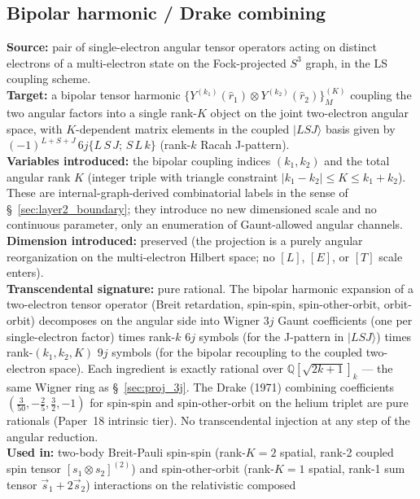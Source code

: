 \documentclass[11pt]{article}
\begin{document}
\subsection{Bipolar harmonic / Drake combining}
\label{sec:proj_bipolar_drake}
\textbf{Source:} pair of single-electron angular tensor operators
acting on distinct electrons of a multi-electron state on the
Fock-projected $S^3$ graph, in the LS coupling scheme.\\
\textbf{Target:} a bipolar tensor harmonic
$\{Y^{(k_1)}(\hat r_1) \otimes Y^{(k_2)}(\hat r_2)\}^{(K)}_M$
coupling the two angular factors into a single rank-$K$ object
on the joint two-electron angular space, with $K$-dependent
matrix elements in the coupled $|LSJ\rangle$ basis given by
$(-1)^{L+S+J}\,6j\{L\,S\,J;\,S\,L\,k\}$ (rank-$k$ Racah J-pattern).\\
\textbf{Variables introduced:} the bipolar coupling indices
$(k_1, k_2)$ and the total angular rank $K$ (integer triple with
triangle constraint $|k_1 - k_2| \le K \le k_1 + k_2$).  These are
internal-graph-derived combinatorial labels in the sense of
\S~\ref{sec:layer2_boundary}; they introduce no new dimensioned
scale and no continuous parameter, only an enumeration of
Gaunt-allowed angular channels.\\
\textbf{Dimension introduced:} preserved (the projection is a
purely angular reorganization on the multi-electron Hilbert
space; no $[L]$, $[E]$, or $[T]$ scale enters).\\
\textbf{Transcendental signature:} pure rational.  The bipolar
harmonic expansion of a two-electron tensor operator (Breit
retardation, spin-spin, spin-other-orbit, orbit-orbit) decomposes
on the angular side into Wigner $3j$ Gaunt coefficients (one per
single-electron factor) times rank-$k$ $6j$ symbols (for the
J-pattern in $|LSJ\rangle$) times rank-$(k_1, k_2, K)$ $9j$
symbols (for the bipolar recoupling to the coupled
two-electron space).  Each ingredient is exactly rational over
$\mathbb{Q}[\sqrt{2k+1}]_{k}$ --- the same Wigner ring as
\S~\ref{sec:proj_3j}.  The Drake (1971) combining coefficients
$(\tfrac{3}{50}, -\tfrac{2}{5}, \tfrac{3}{2}, -1)$ for spin-spin
and spin-other-orbit on the helium triplet are pure rationals
(Paper~18 intrinsic tier).  No transcendental injection at any
step of the angular reduction.\\
\textbf{Used in:} two-body Breit-Pauli spin-spin (rank-$K{=}2$
spatial, rank-2 coupled spin tensor $[s_1 \otimes s_2]^{(2)}$) and
spin-other-orbit (rank-$K{=}1$ spatial, rank-1 sum tensor
$\vec s_1 + 2\vec s_2$) interactions on the relativistic composed
\end{document}
